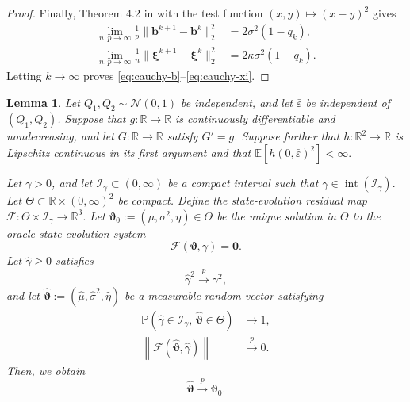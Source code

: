 \documentclass[12pt,reqno]{amsart}
\newtheorem{lemma}{Lemma}
\newcommand{\pr}{\mathbb{P}}
\newcommand{\ccc}{\color{black}}
\renewcommand{\hat}{\widehat}
\newcommand{\pconv}{\overset{{p}}{\to}}
\begin{document}
{\begin{proof}
Finally, Theorem 4.2 in \citep{feng2022unifying} with the test function
$(x,y)\mapsto(x-y)^2$ gives
\begin{align}
\lim_{n,p\to\infty}
\frac1p
\|\bm b^{k+1}-\bm b^k\|_2^2
&=
2\sigma^2(1-q_k),\\
\lim_{n,p\to\infty}
\frac1n
\|\bm\xi^{k+1}-\bm\xi^k\|_2^2
&=
2\kappa\sigma^2(1-q_k).
\end{align}
Letting $k\to\infty$ proves
\eqref{eq:cauchy-b}--\eqref{eq:cauchy-xi}.
\end{proof}
}


{\ccc
\begin{lemma}
\label{lem:SE-conv}
Let $Q_1,Q_2\sim\mathcal{N}(0,1)$ be independent, and let
$\bar\varepsilon$ be independent of $(Q_1,Q_2)$. Suppose that
$g:\mathbb{R}\to\mathbb{R}$ is continuously differentiable and
nondecreasing, and let $G:\mathbb{R}\to\mathbb{R}$ satisfy $G'=g$.
Suppose further that
$h:\mathbb{R}^2\to\mathbb{R}$ is Lipschitz continuous in its first
argument and that $\mathbb{E}\left[h(0,\bar\varepsilon)^2\right]<\infty.$

Let $\gamma>0$, and let
$\mathcal I_\gamma\subset(0,\infty)$ be a compact interval such that $\gamma\in\operatorname{int}(\mathcal I_\gamma).$
Let $\Theta\subset\mathbb{R}\times(0,\infty)^2$ be compact. 
Define the state-evolution residual map $\mathcal F:
\Theta\times\mathcal I_\gamma
\rightarrow
\mathbb{R}^3$.
Let $\bm\vartheta_0:=(\mu,\sigma^2,\eta)\in\Theta$ be the unique solution in $\Theta$ to the oracle state-evolution system
\[
\mathcal F(\bm\vartheta,\gamma)=\bm 0.
\]
Let $\hat\gamma\ge0$ satisfies
\[
\hat\gamma^2\pconv\gamma^2,
\]
and let $\hat{\bm\vartheta}:=(\hat\mu,\hat\sigma^2,\hat\eta)$ be a measurable random vector satisfying
\begin{align}
\pr\left(
\hat\gamma\in\mathcal I_\gamma,\,
\hat{\bm\vartheta}\in\Theta
\right)
&\rightarrow1,
\label{eq:plugin-SE-compactness}\\
\left\|
\mathcal F(\hat{\bm\vartheta},\hat\gamma)
\right\|
&\pconv0.
\label{eq:plugin-SE-approx-root}
\end{align}
Then, we obtain
\[
\hat{\bm\vartheta}
\pconv
\bm\vartheta_0.
\]
\end{lemma}

}
\end{document}
